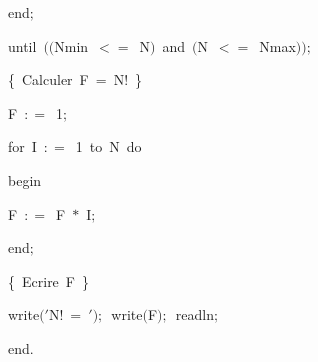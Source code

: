 {\vspace{\neglskip}\mbox{\blc  \blk\blk\blk\idt  \mcl end\idt $;$}\par 
\vspace{\neglskip}\mbox{\blc  \blk\idt  \mcl until\idt \ $($$($Nmin\ $<$$=$\ N$)$\ \mcl and\idt \ $($N\ $<$$=$\ Nmax$)$$)$$;$}\par 
\vspace{\neglskip}\mbox{\blc  \blk\idt  \cmt  \{\ Calculer\ F\ =\ N!\ \}\idt }\par 
\vspace{\neglskip}\mbox{\blc  \blk\idt  F\ $:$$=$\ 1$;$}\par 
\pagebreak[3] 
\vspace{\neglskip}\mbox{\blc  \blk\idt  \mcl for\idt \ I\ $:$$=$\ 1\ \mcl to\idt \ N\ \mcl do\idt \ }\par 
\vspace{\neglskip}\mbox{\blc  \blk\idt  \mcl begin\idt }\par 
\vspace{\neglskip}\mbox{\blc  \blk\blk\idt  F\ $:$$=$\ F\ $\ast$\ I$;$}\par 
\vspace{\neglskip}\mbox{\blc  \blk\idt  \mcl end\idt $;$}\par 
\vspace{\neglskip}\mbox{\blc  \blk\idt  \cmt  \{\ Ecrire\ F\ \}\idt }\par 
\vspace{\neglskip}\mbox{\blc  \blk\idt  write$($\cha $\scriptstyle '$N!\ =\ \idt $\scriptstyle '$$)$$;$\ write$($F$)$$;$\ readln$;$}\par 
\vspace{\neglskip}\mbox{\blc  \idt  \mcl end\idt $.$}\par 

\medskip }

